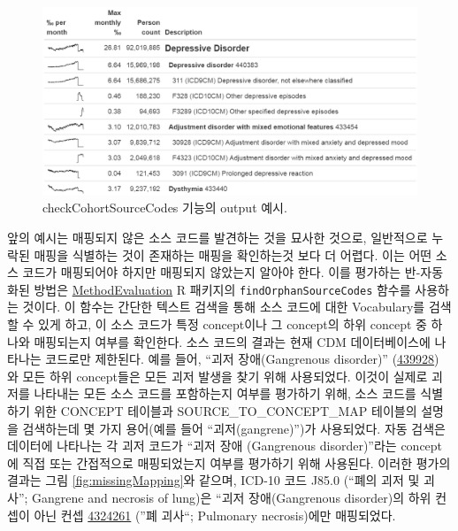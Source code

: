 \documentclass[11pt]{book}
\theoremstyle{definition}
\theoremstyle{definition}
\theoremstyle{definition}
\theoremstyle{remark}
\begin{document}
\begin{figure}

{\centering \includegraphics[width=1\linewidth]{images/DataQuality/sourceCodes} 

}

\caption{checkCohortSourceCodes 기능의 output 예시. }\label{fig:sourceCodes}
\end{figure}

앞의 예시는 매핑되지 않은 소스 코드를 발견하는 것을 묘사한 것으로,
일반적으로 누락된 매핑을 식별하는 것이 존재하는 매핑을 확인하는것 보다
더 어렵다. 이는 어떤 소스 코드가 매핑되어야 하지만 매핑되지 않았는지
알아야 한다. 이를 평가하는 반-자동화된 방법은
\href{https://ohdsi.github.io/MethodEvaluation/}{MethodEvaluation} R
패키지의 \texttt{findOrphanSourceCodes} 함수를 사용하는 것이다. 이
함수는 간단한 텍스트 검색을 통해 소스 코드에 대한 Vocabulary를 검색할 수
있게 하고, 이 소스 코드가 특정 concept이나 그 concept의 하위 concept 중
하나와 매핑되는지 여부를 확인한다. 소스 코드의 결과는 현재 CDM
데이터베이스에 나타나는 코드로만 제한된다. 예를 들어, ``괴저
장애(Gangrenous disorder)''
(\href{http://athena.ohdsi.org/search-terms/terms/439928}{439928}) 와
모든 하위 concept들은 모든 괴저 발생을 찾기 위해 사용되었다. 이것이
실제로 괴저를 나타내는 모든 소스 코드를 포함하는지 여부를 평가하기 위해,
소스 코드를 식별하기 위한 CONCEPT 테이블과 SOURCE\_TO\_CONCEPT\_MAP
테이블의 설명을 검색하는데 몇 가지 용어(예를 들어 ``괴저(gangrene)'')가
사용되었다. 자동 검색은 데이터에 나타나는 각 괴저 코드가 ``괴저 장애
(Gangrenous disorder)''라는 concept에 직접 또는 간접적으로 매핑되었는지
여부를 평가하기 위해 사용된다. 이러한 평가의 결과는 그림
\ref{fig:missingMapping}와 같으며, ICD-10 코드 J85.0 (``폐의 괴저 및
괴사''; Gangrene and necrosis of lung)은 ``괴저 장애(Gangrenous
disorder)의 하위 컨셉이 아닌 컨셉
\href{http://athena.ohdsi.org/search-terms/terms/4324261}{4324261} (''폐
괴사``; Pulmonary necrosis)에만 매핑되었다. 
\end{document}
